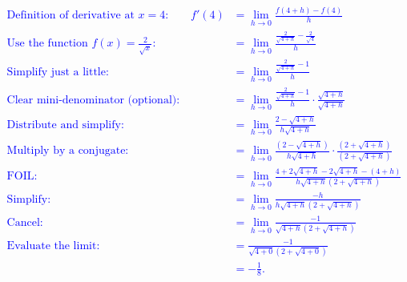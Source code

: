 \documentclass[letterpaper,11pt]{article}
\newcommand{\tsol}[1]{\textcolor{blue}{#1}}
\newcommand{\tsol}[1]{\textcolor{white}{#1}}
\begin{document}
\begin{enumerate}
\begin{enumerate}
\tsol{
\begin{large}
\begin{spreadlines}{.4 in}
\begin{align*}
\text{Definition of derivative at $x=4$:} \qquad f'(4) &= \lim_{h \rightarrow 0} \frac{f\left( 4+h \right) - f(4)}{h} \\
\text{Use the function $f(x)=\frac{2}{\sqrt{x}}$:} \qquad \qquad &= \lim_{h \rightarrow 0} \frac{\frac{2}{\sqrt{4+h}} - \frac{2}{\sqrt{4}}}{h}  \\
\text{Simplify just a little:} \qquad \qquad &= \lim_{h \rightarrow 0} \frac{\frac{2}{\sqrt{4+h}} - 1}{h}  \\
\text{Clear mini-denominator (optional):} \qquad \qquad &= \lim_{h \rightarrow 0} \frac{\frac{2}{\sqrt{4+h}} - 1}{h} \cdot \frac{\sqrt{4+h}}{\sqrt{4+h}} \\
\text{Distribute and simplify:} \qquad \qquad &= \lim_{h \rightarrow 0} \frac{2 - \sqrt{4+h}}{h\sqrt{4+h}}  \\
\text{Multiply by a conjugate:}\qquad \qquad &= \lim_{h \rightarrow 0} \frac{\left( 2 - \sqrt{4+h} \right)}{h\sqrt{4+h}} \cdot \frac{\left( 2+\sqrt{4+h} \right) }{\left( 2+\sqrt{4+h} \right)}\\
\text{FOIL:} \qquad \qquad &= \lim_{h \rightarrow 0} \frac{4 + 2\sqrt{4+h} - 2\sqrt{4+h} - (4+h) }{h\sqrt{4+h}\left( 2+\sqrt{4+h} \right)}\\
\text{Simplify:} \qquad \qquad &= \lim_{h \rightarrow 0} \frac{- h }{h\sqrt{4+h}\left( 2+\sqrt{4+h} \right)}\\
\text{Cancel:} \qquad \qquad &= \lim_{h \rightarrow 0} \frac{- 1 }{\sqrt{4+h}\left( 2+\sqrt{4+h} \right)}\\
\text{Evaluate the limit:} \qquad \qquad &= \frac{- 1 }{\sqrt{4+0}\left( 2+\sqrt{4+0} \right)}\\
&= -\frac{1}{8}.
\end{align*}
\end{spreadlines}
\end{large}
}


\vfill \newpage
\end{enumerate} 

\end{enumerate}
\end{document}
